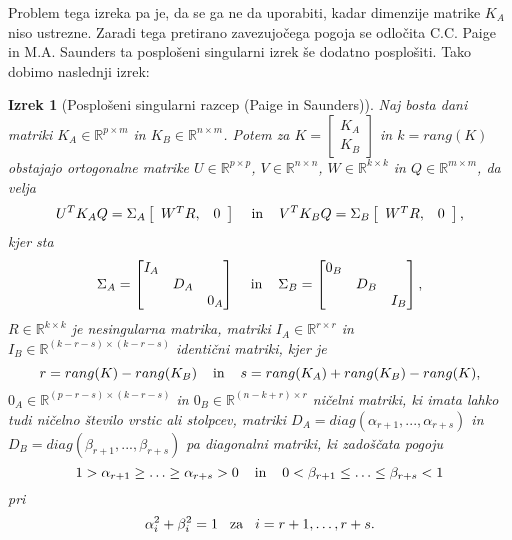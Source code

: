 \documentclass[mat1]{article}
\newtheorem{izrek}{Izrek}
\theoremstyle{definition}
\begin{document}
Problem tega izreka pa je, da se ga ne da uporabiti, kadar dimenzije matrike $K_A$ niso ustrezne. Zaradi tega pretirano zavezujočega pogoja se odločita C.C. Paige in M.A. Saunders ta posplošeni singularni izrek še dodatno posplošiti. Tako dobimo naslednji izrek:
\begin{izrek}[Posplošeni singularni razcep (Paige in Saunders)]
\label{izrek:GSVD} Naj bosta dani matriki $K_A \in \mathbb{R}^{p \times m}$ in $K_B \in \mathbb{R}^{n \times m}$. Potem za $K = \left[\begin{array}{c} K_A \\ K_B \end{array}\right]$ in $k = rang(K)$ obstajajo ortogonalne matrike $U \in \mathbb{R}^{p \times p}$, $V \in \mathbb{R}^{n \times n}$, $W \in \mathbb{R}^{k \times k}$ in $Q \in \mathbb{R}^{m \times m}$, da velja 
\begin{equation} \label{eq4}
U^T K_A Q = \Sigma_A  \left[\begin{array}{cc} W^T R, & 0 \end{array}\right] \hspace{4mm} \text{in} \hspace{4mm} V^T K_B Q = \Sigma_B  \left[\begin{array}{cc} W^T R, & 0 \end{array}\right] \text{,}
\end{equation} kjer sta
$$\Sigma_A = \begin{bmatrix} 
I_A &  & \\
 & D_A & \\
 & & 0_A  
\end{bmatrix} \hspace{4mm} \text{in} \hspace{4mm}
\Sigma_B = \begin{bmatrix} 
0_B &  & \\
 & D_B & \\
 & & I_B  
\end{bmatrix} \text{,}$$ 
$R \in \mathbb{R}^{k \times k}$ je nesingularna matrika, matriki $I_A \in \mathbb{R}^{r \times r}$ in $I_B \in \mathbb{R}^{(k-r-s) \times (k-r-s)}$ identični matriki, kjer je 
$$r = rang(K) - rang(K_B) \hspace{4mm} \text{in} \hspace{4mm} s = rang(K_A) + rang(K_B) - rang(K),$$
$0_A \in \mathbb{R}^{(p-r-s) \times (k-r-s)}$ in $0_B \in \mathbb{R}^{(n-k+r) \times r}$ ničelni matriki, ki imata lahko tudi ničelno število vrstic ali stolpcev, matriki
$D_A = diag(\alpha_{r+1},..., \alpha_{r+s})$ in $D_B = diag(\beta_{r+1},..., \beta_{r+s})$ pa diagonalni matriki, ki zadoščata pogoju
$$1 > \alpha_{r+1} \geq \ldots \geq \alpha_{r+s} > 0 \hspace{4mm} \text{in} \hspace{4mm} 0 < \beta_{r+1} \leq \ldots \leq \beta_{r+s} < 1$$
pri
\begin{equation} \label{alpha+beta-GSVD}
\alpha_i^2 + \beta_i^2 = 1 \hspace{3mm} \text{za} \hspace{3mm} i = r+1,\ldots, r+s
\text{.}
\end{equation}
\end{izrek}
\end{document}
